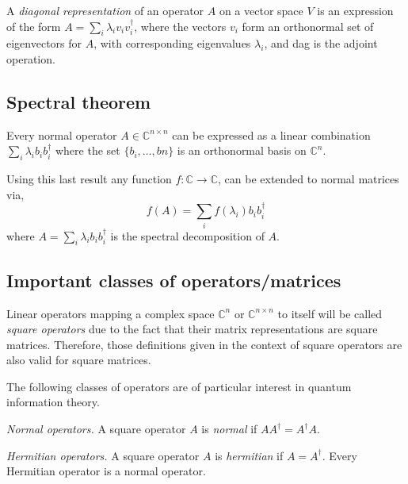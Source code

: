 A \emph{diagonal representation} of an operator $A$ on a vector space $V$ is an expression of the form $A = \sum_i \lambda_i v_i v_i^{\dag}$, where the vectors $v_i$ form an orthonormal set of eigenvectors for $A$, with corresponding eigenvalues $\lambda_i$, and \gls{dag} is the adjoint operation. 


\subsection{Spectral theorem}

\begin{theorem}  \cite{nielsen2010quantum}
  Every normal operator $A \in \mathbb{C}^{n \times n} $ can be expressed as a linear combination $\sum_{i} \lambda_{i}b_{i}b_{i}^{\dag}$ where the set $\{b_{i}, \ldots , b{n}\}$ is an orthonormal basis on $\mathbb{C}^{n}$.
\end{theorem}

Using this last result any function $f:\mathbb{C} \xrightarrow{} \mathbb{C}$, can be extended to normal matrices via,
  \begin{equation} \label{eq:apply_f_diag} 
    f(A) = \sum_{i} f(\lambda_{i})b_{i}b_{i}^{\dag}
\end {equation}
where $A = \sum_{i} \lambda_{i}b_{i}b_{i}^{\dag}$ is the spectral decomposition of $A$.

\subsection{Important classes of operators/matrices}

Linear operators mapping a complex space $\mathbb{C}^{n}$ or $\mathbb{C}^{n\times n}$  to itself will be called \emph{square operators} due to the fact that their matrix representations are square matrices. Therefore, those definitions given in the context of square operators are also valid for square matrices.

The following classes of operators are of particular interest in quantum information theory.

\begin{definition}
  \emph{Normal operators.} A square operator $A$ is \emph{normal} if $AA^{\dagger} = A^{\dagger}A$.
\end{definition}

\begin{definition} \label{def:hermitian}
  \emph{Hermitian operators.} A square operator $A$ is \emph{hermitian} if $A = A^{\dagger}$. Every Hermitian operator is a normal operator.
\end {definition}

